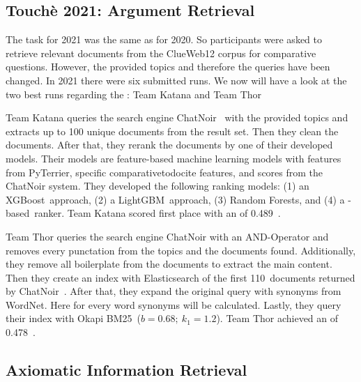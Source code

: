 \subsection{Touchè 2021: Argument Retrieval}

The task for 2021 was the same as for 2020.
So participants were asked to retrieve relevant documents from the ClueWeb12 corpus for comparative questions.
However, the provided topics and therefore the queries have been changed.
In 2021 there were six submitted runs.
We now will have a look at the two best runs regarding the : Team Katana and Team Thor~\cite{BondarenkoGFBAPBSWPH2021}

Team Katana queries the search engine ChatNoir~\cite{BevendorffSHP2018} with the provided topics and extracts up to 100 unique documents from the result set.
Then they clean the documents. 
After that, they rerank the documents by one of their developed models.
Their models are feature-based machine learning models with features from PyTerrier, specific comparativetodocite features, and scores from the ChatNoir system. They developed the following ranking models:
(1) an XGBoost~\todocite approach, (2) a LightGBM~\todocite approach, (3) Random Forests, and (4) a \Bert-based~\todocite ranker.
Team Katana scored first place with an  of 0.489~\cite{ChekalinaP2021}.

Team Thor queries the search engine ChatNoir with an AND-Operator and removes every punctation from the topics and the documents found.
Additionally, they remove all boilerplate from the documents to extract the main content.
Then they create an index with Elasticsearch of the first 110~documents returned by ChatNoir~\todocite.
After that, they expand the original query with synonyms from WordNet.
Here for every word synonyms will be calculated.
Lastly, they query their index with Okapi BM25~(\( b = 0.68;~k_1 = 1.2 \)).
Team Thor achieved an  of 0.478~\cite{ShirshakovaW2021}.

\subsection{Axiomatic Information Retrieval}

